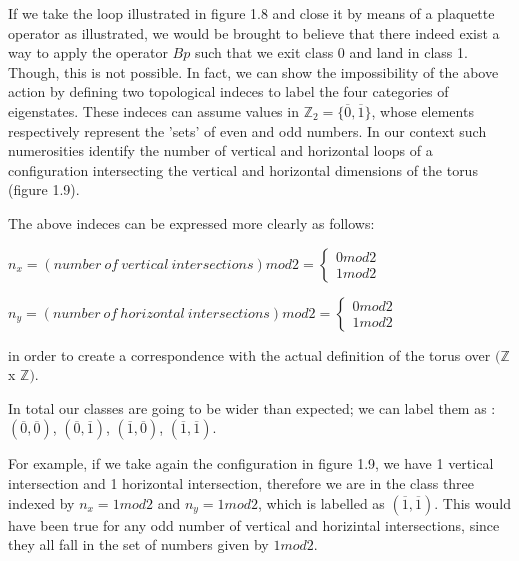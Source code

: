 \documentclass{Configuration_Files/PoliMi3i_thesis}
\begin{document}
If we take the loop illustrated in figure 1.8 and close it by means of a plaquette operator as illustrated, we would be brought to believe that there indeed exist a way to apply the operator $Bp$ such that we exit class 0 and land in class 1. Though, this is not possible. \newline
In fact, we can show the impossibility of the above action by defining two topological indeces to label the four categories of eigenstates. These indeces can assume values in $\mathbb{Z}_2=\{\overline{0},\overline{1} \}$, whose elements respectively represent the 'sets' of even and odd numbers. In our context such numerosities identify the number of vertical and horizontal loops of a configuration intersecting the vertical and horizontal dimensions of the torus (figure 1.9).

The above indeces can be expressed more clearly as follows: 

\begin{center}
	$n_x= (number \ of \ vertical \ intersections)mod2 = 
	\begin{cases} 
		0mod2 \\
		1mod2  
	\end{cases}$ 
\end{center}
\begin{center}
	$n_y= (number \ of \ horizontal \ intersections)mod2 =\begin{cases} 
		0mod2 \\
		1mod2  
	\end{cases}$ 
\end{center}


in order to create a correspondence with the actual definition of the torus over $(\mathbb{Z}$ x $\mathbb{Z})$. 

In total our classes are going to be wider than expected; we can label them as : $(\overline{0},\overline{0} )$, $(\overline{0},\overline{1} )$, $(\overline{1},\overline{0})$, $(\overline{1},\overline{1})$.\newline

For example, if we take again the configuration in figure 1.9, we have 1 vertical intersection and 1 horizontal intersection, therefore we are in the class three indexed by $n_x=1mod2$ and $n_y=1mod2$, which is labelled as $(\overline{1},\overline{1})$. This would have been true for any odd number of vertical and horizintal intersections, since they all fall in the set of numbers given by $1mod2$.
\end{document}
